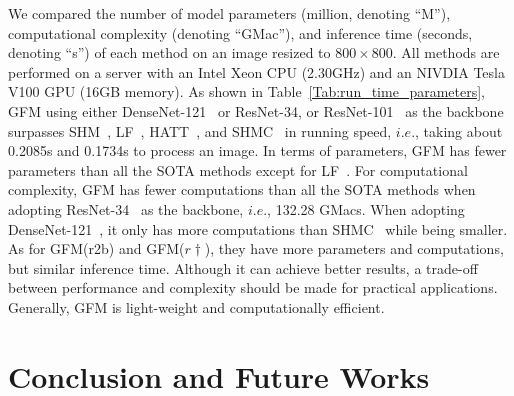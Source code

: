 \documentclass[twocolumn]{svjour3}
\begin{document}
We compared the number of model parameters (million, denoting ``M''), computational complexity (denoting ``GMac''), and inference time (seconds, denoting ``s'') of each method on an image resized to $800\times800$. All methods are performed on a server with an Intel Xeon CPU (2.30GHz) and an NIVDIA Tesla V100 GPU (16GB memory). As shown in Table~\ref{Tab:run_time_parameters}, GFM using either DenseNet-121~\citep{huang2017densely} or ResNet-34, or ResNet-101~\citep{he2016deep} as the backbone surpasses SHM~\citep{chen2018semantic}, LF~\citep{zhang2019late}, HATT~\citep{Qiao_2020_CVPR}, and SHMC~\citep{liu2020boosting} in running speed, $i.e.$, taking about 0.2085s and 0.1734s to process an image. In terms of parameters, GFM has fewer parameters than all the SOTA methods except for LF~\citep{zhang2019late}. For computational complexity, GFM has fewer computations than all the SOTA methods when adopting ResNet-34~\citep{he2016deep} as the backbone, $i.e.$, 132.28 GMacs. When adopting DenseNet-121~\citep{huang2017densely}, it only has more computations than SHMC~\citep{liu2020boosting} while being smaller. As for GFM(r2b) and GFM($r\dag$), they have more parameters and computations, but similar inference time. Although it can achieve better results, a trade-off between performance and complexity should be made for practical applications. Generally, GFM is light-weight and computationally efficient.


\section{Conclusion and Future Works}
\end{document}
